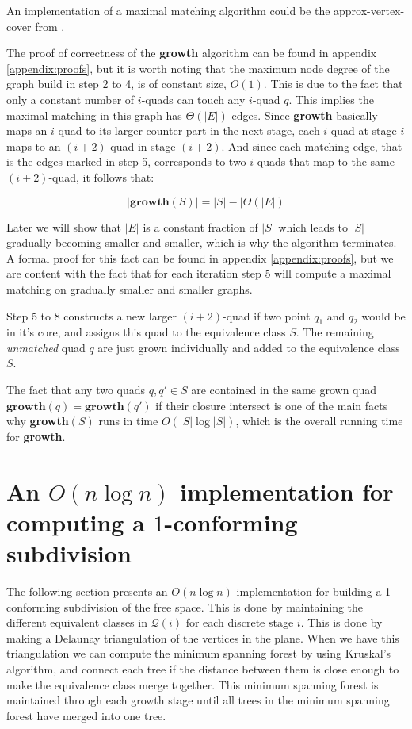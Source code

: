 An implementation of a maximal matching algorithm could be the approx-vertex-cover from \cite{IntroToAlg}.

The proof of correctness of the \textbf{growth} algorithm can be found in appendix 
\ref{appendix:proofs}, but it is worth noting that the maximum node degree of the 
graph build in step 2 to 4, is of constant size, $O(1)$. This is due to the fact that only a 
constant number of $i$-quads can touch any $i$-quad $q$. This implies the maximal matching in 
this graph has $\Theta (|E|)$ edges. Since \textbf{growth} basically maps an $i$-quad to its 
larger counter part in the next stage, each $i$-quad at stage $i$ maps to an $(i+2)$-quad in 
stage $(i+2)$. And since each matching edge, that is the edges marked in step 5, corresponds 
to two $i$-quads that map to the same $(i+2)$-quad, it follows that:

$$|\mathbf{growth}(S)| = |S| - |\Theta(|E|)$$

Later we will show that $|E|$ is a constant fraction of $|S|$ which leads to $|S|$ gradually 
becoming smaller and smaller, which is why the algorithm terminates. A formal proof for this 
fact can be found in appendix \ref{appendix:proofs}, but we are content 
with the fact that for each iteration step 5 will compute a maximal matching on gradually 
smaller and smaller graphs.  

Step 5 to 8 constructs a new larger $(i+2)$-quad if two point $q_1$ and $q_2$ would be in it's 
core, and assigns this quad to the equivalence class $S$. The remaining \textit{unmatched} 
quad $q$ are just grown individually and added to the equivalence class $S$.

The fact that any two quads $q, q' \in S$ are contained in the same grown quad $\mathbf{growth}
(q) = \mathbf{growth}(q')$ if their closure intersect is one of the main facts why 
\textbf{growth}$(S)$ runs in time $O(|S| \log |S|)$, which is the overall running time for 
\textbf{growth}.

\section{An $O(n \log n)$ implementation for computing a $1$-conforming subdivision} 
\label{section:implementationconforming}

The following section presents an $O(n \log n)$ implementation for building a 1-conforming 
subdivision of the free space. This is done by maintaining the different equivalent classes in 
$\mathcal{Q}(i)$ for each discrete stage $i$. This is done by making a Delaunay triangulation 
of the vertices in the plane. When we have this triangulation we can compute the minimum spanning 
forest by using Kruskal's algorithm, and connect each tree if the distance between them is close 
enough to make the equivalence class merge together. This minimum spanning forest is maintained 
through each growth stage until all trees in the minimum spanning forest have merged into one tree.

